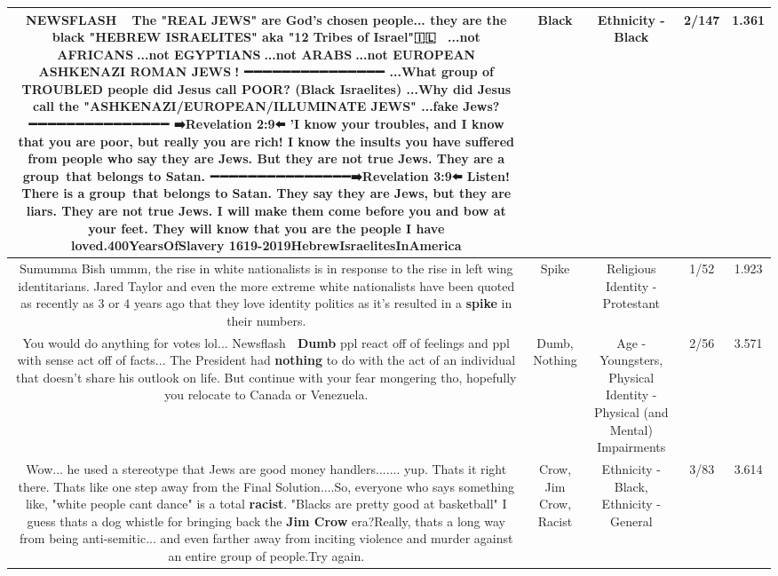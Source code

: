 \documentclass[11pt]{article}
\newlength\mylength
\begin{document}
\begin{center}
\begin{longtable}{|C{.65\mylength}|C{.30\mylength}|C{.12\mylength}|C{.12\mylength}|C{.12\mylength}|}
  \small NEWSFLASH📣📣📣 The "REAL JEWS" are God's chosen people... they are the \textbf{black} "HEBREW ISRAELITES" aka "12 Tribes of Israel"🇮🇱✊🏾 ...not AFRICANS🚫...not EGYPTIANS🚫...not ARABS🚫...not EUROPEAN ASHKENAZI ROMAN JEWS🚫! ➖➖➖➖➖➖➖➖➖➖➖➖➖➖➖ ...What group of TROUBLED people did Jesus call POOR? (\textbf{Black} Israelites) ...Why did Jesus call the "ASHKENAZI/EUROPEAN/ILLUMINATE JEWS" ...fake Jews? ➖➖➖➖➖➖➖➖➖➖➖➖➖➖➖ ➡️Revelation 2:9⬅️ 'I know your troubles, and I know that you are poor, but really you are rich! I know the insults you have suffered from people who say they are Jews. But they are not true Jews. They are a group that belongs to Satan. ➖➖➖➖➖➖➖➖➖➖➖➖➖➖➖➡️Revelation 3:9⬅️ Listen! There is a group that belongs to Satan. They say they are Jews, but they are liars. They are not true Jews. I will make them come before you and bow at your feet. They will know that you are the people I have loved.400YearsOfSlavery 1619-2019HebrewIsraelitesInAmerica\normalsize   & Black & Ethnicity - Black & 2/147 & 1.361 \\  \hline
  \small Sumumma Bish ummm, the rise in white nationalists is in response to the rise in left wing identitarians. Jared Taylor and even the more extreme white nationalists have been quoted as recently as 3 or 4 years ago that they love identity politics as it's resulted in a \textbf{spike} in their numbers.\normalsize   & Spike & Religious Identity - Protestant & 1/52 & 1.923 \\  \hline
  \small You would do anything for votes lol... Newsflash 🚨 \textbf{Dumb} ppl react off of feelings and ppl with sense act off of facts... The President had \textbf{nothing} to do with the act of an individual that doesn't share his outlook on life. But continue with your fear mongering tho, hopefully you relocate to Canada or Venezuela.\normalsize   & Dumb, Nothing & Age - Youngsters, Physical Identity - Physical (and Mental) Impairments & 2/56 & 3.571 \\  \hline
  \small Wow... he used a stereotype that Jews are good money handlers....... yup. Thats it right there. Thats like one step away from the Final Solution....So, everyone who says something like, "white people cant dance" is a total \textbf{racist}. "Blacks are pretty good at basketball" I guess thats a dog whistle for bringing back the \textbf{Jim C\textbf{row}} era?Really, thats a long way from being anti-semitic... and even farther away from inciting violence and murder against an entire group of people.Try again.\normalsize   & Crow, Jim Crow, Racist & Ethnicity - Black, Ethnicity - General & 3/83 & 3.614 \\  \hline

\end{longtable}
\end{center}
\end{document}
